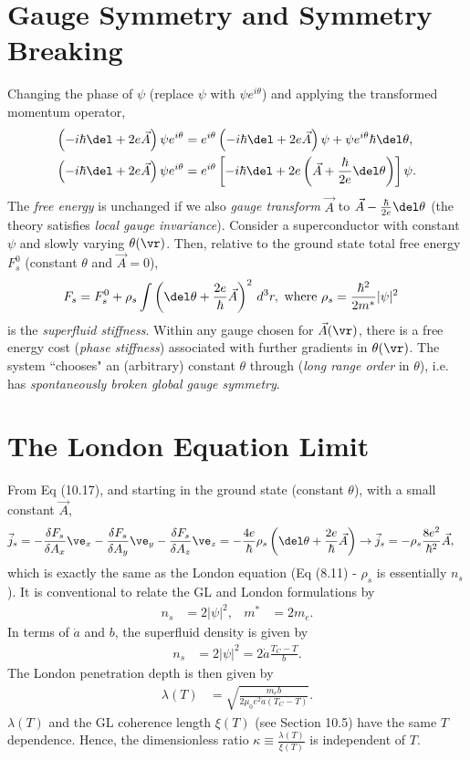 \documentclass[a4paper, 11pt, normalem]{report}
\begin{document}
\section{Gauge Symmetry and Symmetry Breaking}
Changing the phase of $\psi$ (replace $\psi$ with $\psi e^{i\theta}$) and applying the transformed momentum operator,
\begin{align}
    \left(-i\hbar\del+2e\vec{A}\right)\psi e^{i\theta} &= e^{i\theta}\left(-i\hbar\del+2e\vec{A}\right)\psi + \psi e^{i\theta}\hbar\del\theta,\\
    \left(-i\hbar\del+2e\vec{A}\right)\psi e^{i\theta} &= e^{i\theta}\left[-i\hbar\del+2e\left(\vec{A}+\frac{\hbar}{2e}\del\theta\right)\right]\psi.
\end{align}
The \emph{free energy} is unchanged if we also \emph{gauge transform} $\vec{A}$ to $\vec{A}-\frac{\hbar}{2e}\del\theta$ (the theory satisfies \emph{local gauge invariance}).
Consider a superconductor with constant $\psi$ and slowly varying $\theta(\vr)$.
Then, relative to the ground state total free energy $F_s^0$ (constant $\theta$ and $\vec{A}=0$),
\begin{align}
    F_s &= F_s^0 + \rho_s\int\left(\del\theta+\frac{2e}{\hbar}\vec{A}\right)^2\,d^3r, \text{ where } \rho_s = \frac{\hbar^2}{2m^*}|\psi|^2
\end{align}
is the \emph{superfluid stiffness}.
Within any gauge chosen for $\vec{A}(\vr)$, there is a free energy cost (\emph{phase stiffness}) associated with further gradients in $\theta(\vr)$.
The system ``chooses" an (arbitrary) constant $\theta$ through (\emph{long range order} in $\theta$), i.e. has \emph{spontaneously broken global gauge symmetry}.

\section{The London Equation Limit}
From Eq (10.17), and starting in the ground state (constant $\theta$), with a small constant $\vec{A}$,
\begin{align}
    \vec{j}_s &= -\frac{\delta F_s}{\delta A_x}\ve_x - \frac{\delta F_s}{\delta A_y}\ve_y - \frac{\delta F_s}{\delta A_z}\ve_z = -\frac{4e}{\hbar}\rho_s\left(\del\theta+\frac{2e}{\hbar}\vec{A}\right) \to \vec{j}_s = -\rho_s\frac{8e^2}{\hbar^2}\vec{A},
\end{align}
which is exactly the same as the London equation (Eq (8.11) - $\rho_s$ is essentially $n_s$).
It is conventional to relate the GL and London formulations by
\begin{align}
    n_s &= 2|\psi|^2, & m^* &= 2m_e.
\end{align}
In terms of $\dot{a}$ and $b$, the superfluid density is given by
\begin{align}
    n_s &= 2|\psi|^2 = 2\dot{a}\frac{T_C-T}{b}.
\end{align}
The London penetration depth is then given by
\begin{align}
    \lambda(T) &= \sqrt{\frac{m_eb}{2\mu_0e^2\dot{a}(T_C-T)}}.
\end{align}
$\lambda(T)$ and the GL coherence length $\xi(T)$ (see Section 10.5) have the same $T$ dependence.
Hence, the dimensionless ratio $\kappa \equiv \frac{\lambda(T)}{\xi(T)}$ is independent of $T$.
\end{document}
